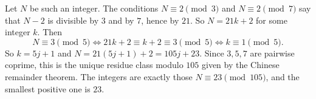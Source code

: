 Let \(N\) be such an integer. The conditions \(N\equiv 2\pmod 3\) and \(N\equiv 2\pmod 7\) say that \(N-2\) is divisible by \(3\) and by \(7\), hence by \(21\). So \(N=21k+2\) for some integer \(k\). Then
\[
N\equiv 3\pmod 5\iff 21k+2\equiv k+2\equiv 3\pmod 5\iff k\equiv 1\pmod 5 .
\]
So \(k=5j+1\) and \(N=21(5j+1)+2=105j+23\). Since \(3,5,7\) are pairwise coprime, this is the unique residue class modulo \(105\) given by the Chinese remainder theorem. The integers are exactly those \(N\equiv 23\pmod{105}\), and the smallest positive one is \(\boxed{23}\).
